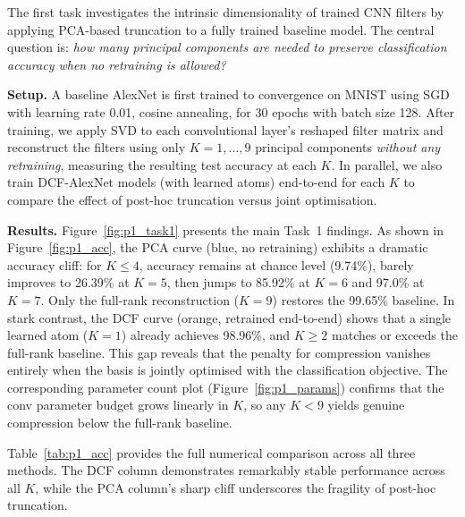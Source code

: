 \documentclass[11pt,letterpaper]{article}
\begin{document}
The first task investigates the intrinsic dimensionality of trained CNN
filters by applying PCA-based truncation to a fully trained baseline model.
The central question is: \emph{how many principal components are needed to
preserve classification accuracy when no retraining is allowed?}

\textbf{Setup.}
A baseline AlexNet is first trained to convergence on MNIST using SGD with
learning rate 0.01, cosine annealing, for 30 epochs with batch size 128.
After training, we apply SVD to each convolutional layer's reshaped filter
matrix and reconstruct the filters using only $K = 1, \ldots, 9$ principal
components \emph{without any retraining}, measuring the resulting test
accuracy at each $K$.  In parallel, we also train DCF-AlexNet models
(with learned atoms) end-to-end for each $K$ to compare the effect of
post-hoc truncation versus joint optimisation.

\textbf{Results.}
Figure~\ref{fig:p1_task1} presents the main Task~1 findings.
As shown in Figure~\ref{fig:p1_acc}, the PCA curve (blue, no retraining)
exhibits a dramatic accuracy cliff: for $K \le 4$, accuracy remains at
chance level (9.74\%), barely improves to 26.39\% at $K=5$, then jumps to
85.92\% at $K=6$ and 97.0\% at $K=7$.  Only the full-rank reconstruction
($K=9$) restores the 99.65\% baseline.  In stark contrast, the DCF curve
(orange, retrained end-to-end) shows that a single learned atom ($K=1$)
already achieves 98.96\%, and $K \ge 2$ matches or exceeds the full-rank
baseline.  This gap reveals that the penalty for compression vanishes
entirely when the basis is jointly optimised with the classification
objective.  The corresponding parameter count plot
(Figure~\ref{fig:p1_params}) confirms that the conv parameter budget
grows linearly in $K$, so any $K < 9$ yields genuine compression below the
full-rank baseline.

Table~\ref{tab:p1_acc} provides the full numerical comparison across all
three methods.  The DCF column demonstrates remarkably stable performance
across all $K$, while the PCA column's sharp cliff underscores the
fragility of post-hoc truncation.
\end{document}
